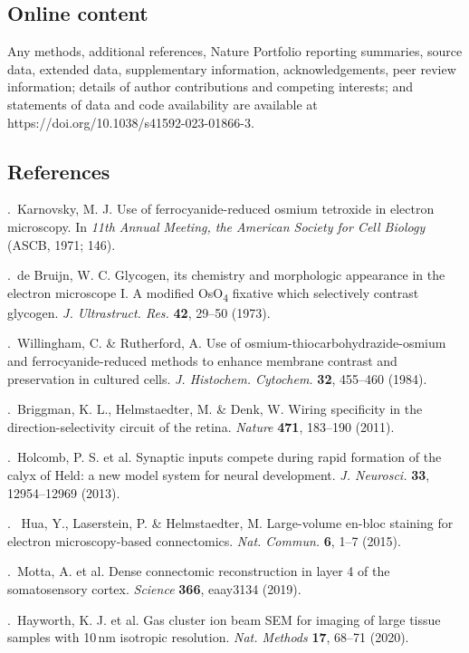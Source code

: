 \documentclass{article}
\begin{document}
\subsection*{Online content}
Any methods, additional references, Nature Portfolio reporting summaries, source data, extended data, supplementary information, acknowledgements, peer review information; details of author contributions and competing interests; and statements of data and code availability are available at https://doi.org/10.1038/s41592-023-01866-3.

\subsection*{References}
.\ Karnovsky, M. J. Use of ferrocyanide-reduced osmium tetroxide in electron microscopy. In \emph{11th Annual Meeting, the American Society for Cell Biology} (ASCB, 1971; 146).\par
{}.\ de Bruijn, W. C. Glycogen, its chemistry and morphologic appearance in the electron microscope I. A modified OsO\textsubscript{4} fixative which selectively contrast glycogen. \emph{J. Ultrastruct. Res.} \textbf{42}, 29–50 (1973).\par
{}.\ Willingham, C. \& Rutherford, A. Use of osmium-thiocarbohydrazide-osmium and ferrocyanide-reduced methods to enhance membrane contrast and preservation in cultured cells. \emph{J. Histochem. Cytochem.} \textbf{32}, 455–460 (1984).\par
{}.\ Briggman, K. L., Helmstaedter, M. \& Denk, W. Wiring specificity in the direction-selectivity circuit of the retina. \emph{Nature} \textbf{471}, 183–190 (2011).\par
{}.\ Holcomb, P. S. et al. Synaptic inputs compete during rapid formation of the calyx of Held: a new model system for neural development. \emph{J. Neurosci.} \textbf{33}, 12954–12969 (2013).\par
{}.\  Hua, Y., Laserstein, P. \& Helmstaedter, M. Large-volume en-bloc staining for electron microscopy-based connectomics. \emph{Nat. Commun.} \textbf{6}, 1–7 (2015).\par
{}.\ Motta, A. et al. Dense connectomic reconstruction in layer 4 of the somatosensory cortex. \emph{Science} \textbf{366}, eaay3134 (2019).\par
{}.\ Hayworth, K. J. et al. Gas cluster ion beam SEM for imaging of large tissue samples with 10\,nm isotropic resolution. \emph{Nat. Methods} \textbf{17}, 68–71 (2020).\par
\end{document}
